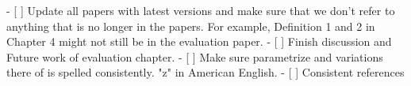   - [ ] Update all papers with latest versions and make sure that we don't refer to anything that is no longer in the papers. For example, Definition 1 and 2 in Chapter 4 might not still be in the evaluation paper.
  - [ ] Finish discussion and Future work of evaluation chapter.
  - [ ] Make sure parametrize and variations there of is spelled consistently. "z" in American English.
  - [ ] Consistent references
  